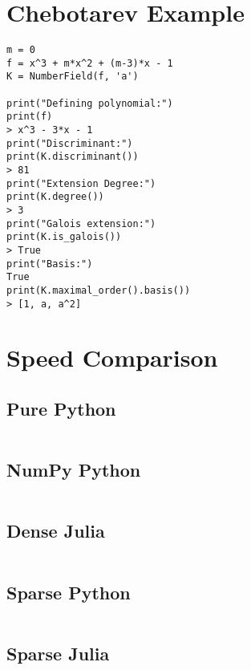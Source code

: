 
\section{Chebotarev Example}
\label{code:ChebotarevExample}
\begin{verbatim}
m = 0
f = x^3 + m*x^2 + (m-3)*x - 1
K = NumberField(f, 'a')

print("Defining polynomial:")
print(f)
> x^3 - 3*x - 1
print("Discriminant:")
print(K.discriminant())
> 81
print("Extension Degree:")
print(K.degree())
> 3
print("Galois extension:")
print(K.is_galois())
> True
print("Basis:")
True
print(K.maximal_order().basis())
> [1, a, a^2]
\end{verbatim}



\section{Speed Comparison}
\subsection{Pure Python}
\label{code:PurePython}
\inputminted[lastline=19, breaklines]{python}{SpeedComparison/PurePython.py}

\subsection{NumPy Python}
\label{code:NumPyPython}
\inputminted[lastline=21, breaklines]{python}{SpeedComparison/NumPyPython.py}

\subsection{Dense Julia}
\label{code:DenseJulia}
\inputminted[lastline=24, breaklines]{julia}{SpeedComparison/DenseJulia.jl}

\subsection{Sparse Python}
\label{code:SparsePython}
\inputminted[lastline=18, breaklines]{python}{SpeedComparison/SparsePython.py}

\subsection{Sparse Julia}
\label{code:SparseJulia}
\inputminted[lastline=24, breaklines]{julia}{SpeedComparison/SparseJulia.jl}




